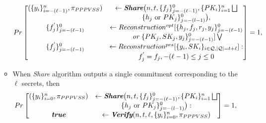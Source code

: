 \begin{itemize}
\begin{itemize}
        \begin{align*}
          Pr\begin{bmatrix}
            (\{y_i\}_{i=-(\ell-1)}^n,\pi_{PPPVSS})&\leftarrow \textit{\textbf{Share}} \big(n,t,\{f_j\}_{j=-(\ell-1)}^0,\{PK_i\}_{i=1}^n\bigsqcup\\
            &\{h_j\text{ or }PK_j\}_{j=-(l-1)}^0\big),\\
            \{f_j^{'}\}_{j=-(\ell-1)}^0&\leftarrow Reconstruction^{opt}[\{h_j,f_j,r_j,y_j\}_{j=-(\ell-1)}^0\\
            &\textit{ or }\{PK_j,SK_j,y_j\}_{j=-(\ell-1)}^0]\bigvee\\
            \{f_j^{'}\}_{j=-(\ell-1)}^0&\leftarrow Reconstruction^{pes}[\{y_i,SK_i\}_{i\in\mathcal{Q},|\mathcal{Q}|=t+\ell}]:\\
            &f_j^{'}=f_j,-(\ell-1)\leq j\leq 0
          \end{bmatrix} = 1,
        \end{align*}
      \item When \textit{Share} algorithm outputs a single commitment corresponding to the $\ell$ secrets, then
        \begin{align*}
          Pr\begin{bmatrix}
            (\{y_i\}_{i=0}^n,\pi_{PPPVSS})&\leftarrow \textit{\textbf{Share}} \big(n,t,\{f_j\}_{j=-(\ell-1)}^0,\{PK_i\}_{i=1}^n\bigsqcup\\
            &\{h_j\text{ or }PK_j\}_{j=-(l-1)}^0\big):\\
            \textit{\textbf{true}}&\leftarrow \textit{\textbf{Verify}} (n,t,\ell,\{y_i\}_{i=0}^n,\pi_{PPPVSS})
          \end{bmatrix} = 1,
        \end{align*}
    

\end{itemize}
\end{itemize}
